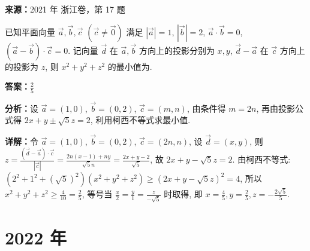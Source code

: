 \begin{question}[points=4]
\textbf{来源：}2021 年 浙江卷，第 17 题\par
已知平面向量 $\vec{a},\vec{b},\vec{c}$ $(\vec{c}\neq\vec{0})$ 满足 $|\vec{a}|=1$, $|\vec{b}|=2$, $\vec{a}\cdot\vec{b}=0$, $(\vec{a}-\vec{b})\cdot\vec{c}=0$. 记向量 $\vec{d}$ 在 $\vec{a},\vec{b}$ 方向上的投影分别为 $x,y$, $\vec{d}-\vec{a}$ 在 $\vec{c}$ 方向上的投影为 $z$, 则 $x^2+y^2+z^2$ 的最小值为.
\fillin[{$\frac{2}{5}$}]
\begin{solution}
\textbf{答案：}$\frac{2}{5}$

\textbf{分析：}设 $\vec{a}=(1,0)$, $\vec{b}=(0,2)$, $\vec{c}=(m,n)$, 由条件得 $m=2n$, 再由投影公式得 $2x+y\pm\sqrt{5}z=2$, 利用柯西不等式求最小值.

\textbf{详解：}令 $\vec{a}=(1,0)$, $\vec{b}=(0,2)$, $\vec{c}=(2n,n)$, 设 $\vec{d}=(x,y)$, 则 $z = \frac{(\vec{d}-\vec{a})\cdot\vec{c}}{|\vec{c}|} = \frac{2n(x-1)+ny}{\sqrt{5}n} = \frac{2x+y-2}{\sqrt{5}}$, 故 $2x+y-\sqrt{5}z=2$. 由柯西不等式: $(2^2+1^2+(\sqrt{5})^2)(x^2+y^2+z^2) \geq (2x+y-\sqrt{5}z)^2=4$, 所以 $x^2+y^2+z^2 \geq \frac{4}{10}=\frac{2}{5}$, 等号当 $\frac{x}{2}=\frac{y}{1}=\frac{z}{-\sqrt{5}}$ 时取得, 即 $x=\frac{4}{5},y=\frac{2}{5},z=-\frac{2\sqrt{5}}{5}$.
\end{solution}
\end{question}

\section*{2022 年}

